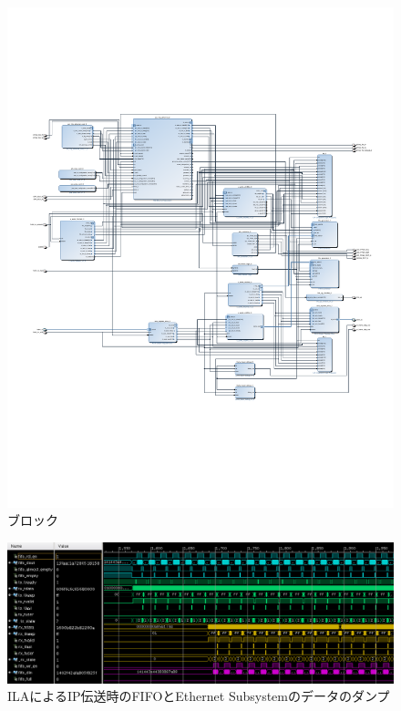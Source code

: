 \begin{figure}[htbp]
    \begin{center}
        \includegraphics[bb=0 0 612 792,width=15.5cm]{img/ethlogic_template_ss.pdf}
    \end{center}
    \caption{ブロック}
    \label{fig:ethlogic_template_ss}
\end{figure}

\begin{figure}[htbp]
    \begin{center}
        \includegraphics[bb=0 0 1201 438,width=15.5cm]{img/fpga-ila-fifo-to-eth.png}
    \end{center}
    \caption{ILAによるIP伝送時のFIFOとEthernet Subsystemのデータのダンプ}
    \label{fig:fpga-ila-fifo-to-eth}
\end{figure}

